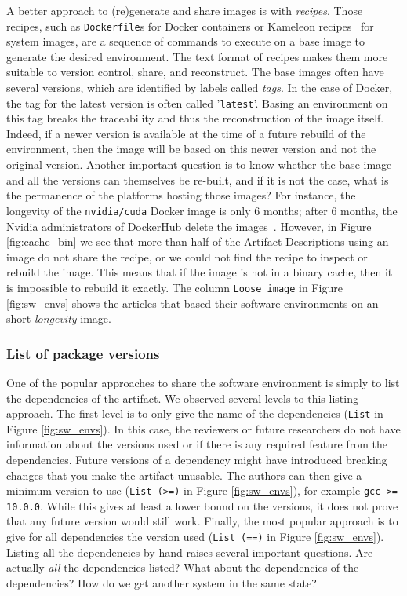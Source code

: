 \documentclass[sigconf,natbib=false]{acmart}
\newcommand{\ad}{Artifact Description}
\begin{document}
A better approach to (re)generate and share images is with \emph{recipes}.
Those recipes, such as \texttt{Dockerfile}s for Docker containers or Kameleon recipes~\cite{ruiz_reconstructable_2015} for system images, are a sequence of commands to execute on a base image to generate the desired environment.
The text format of recipes makes them more suitable to version control, share, and reconstruct.
The base images often have several versions, which are identified by labels called \emph{tags}.
In the case of Docker, the tag for the latest version is often called '\texttt{latest}'.
Basing an environment on this tag breaks the traceability and thus the reconstruction of the image itself.
Indeed, if a newer version is available at the time of a future rebuild of the environment, then the image will be based on this newer version and not the original version.
Another important question is to know whether the base image and all the versions can themselves be re-built, and if it is not the case, what is the permanence of the platforms hosting those images?
For instance, the longevity of the \texttt{nvidia/cuda} Docker image is only 6 months; after 6 months, the Nvidia administrators of DockerHub delete the images\ \cite{nvidia_cuda_lifetime}.
However, in Figure \ref{fig:cache_bin} we see that more than half of the \ad s using an image do not share the recipe, or we could not find the recipe to inspect or rebuild the image.
This means that if the image is not in a binary cache, then it is impossible to rebuild it exactly.
The column \texttt{Loose image} in Figure \ref{fig:sw_envs} shows the articles that based their software environments on an short \emph{longevity} image.


\subsubsection{List of package versions}\label{sec:sop:sw:list}

One of the popular approaches to share the software environment is simply to list the dependencies of the artifact.
We observed several levels to this listing approach.
The first level is to only give the name of the dependencies (\texttt{List} in Figure \ref{fig:sw_envs}).
In this case, the reviewers or future researchers do not have information about the versions used or if there is any required feature from the dependencies.
Future versions of a dependency might have introduced breaking changes that you make the artifact unusable.
The authors can then give a minimum version to use (\texttt{List (>=)} in Figure \ref{fig:sw_envs}), for example \texttt{gcc >= 10.0.0}.
While this gives at least a lower bound on the versions, it does not prove that any future version would still work.
Finally, the most popular approach is to give for all dependencies the version used (\texttt{List (==)} in Figure \ref{fig:sw_envs}).
Listing all the dependencies by hand raises several important questions.
Are actually \emph{all} the dependencies listed?
What about the dependencies of the dependencies?
How do we get another system in the same state?
\end{document}
